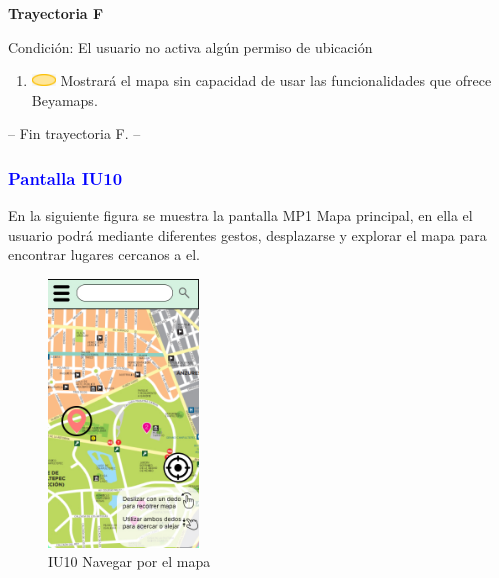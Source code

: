 \textbf{Trayectoria F}

Condición: El usuario no activa algún permiso de ubicación
\begin{enumerate}
    \item \includegraphics[width=0.0500\textwidth]{Figuras/sistema.png} Mostrará el mapa sin capacidad de usar las funcionalidades que ofrece Beyamaps.
    \end{enumerate}
-- Fin trayectoria F. --\\


\subsubsection{\textcolor{blue}{Pantalla IU10}}
En la siguiente figura se muestra la pantalla MP1 Mapa principal, en ella el usuario podrá mediante diferentes gestos, desplazarse y explorar el mapa para encontrar lugares cercanos a el. 

    \begin{figure}[htb]
        \centering
        \includegraphics[width= 4cm]{Pantallas Prototipo3/IU10 - Mapa principal.jpg}
        \caption{IU10 Navegar por el mapa}
        \label{fig:enter-label}
    \end{figure}

